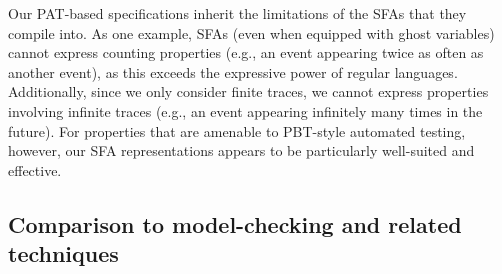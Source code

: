 Our PAT-based specifications inherit the limitations of the SFAs that
they compile into. As one example, SFAs (even when equipped with ghost
variables) cannot express counting properties (e.g., an event
appearing twice as often as another event), as this exceeds the
expressive power of regular languages. Additionally, since we only
consider finite traces, we cannot express properties involving
infinite traces (e.g., an event appearing infinitely many times in the
future). For properties that are amenable to PBT-style automated
testing, however, our SFA representations appears to be particularly
well-suited and effective.


%


\subsection{Comparison to model-checking and related techniques}

